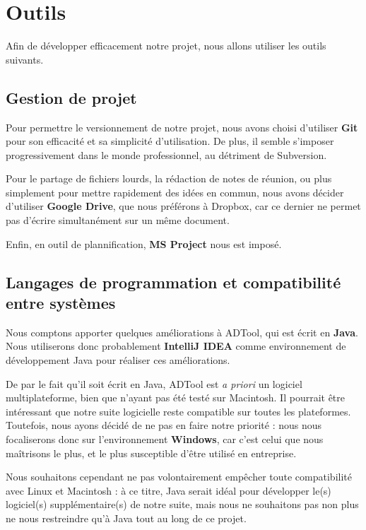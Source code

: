 \section{Outils}
    Afin de développer efficacement notre projet, nous allons utiliser les outils suivants.
     
    \subsection{Gestion de projet}
        Pour permettre le versionnement de notre projet, nous avons choisi d'utiliser {\bf Git} pour son efficacité et sa simplicité d'utilisation. De plus, il semble s'imposer progressivement dans le monde professionnel, au détriment de Subversion.
        
        Pour le partage de fichiers lourds, la rédaction de notes de réunion, ou plus simplement pour mettre rapidement des idées en commun, nous avons décider d'utiliser {\bf Google Drive}, que nous préférons à Dropbox, car ce dernier ne permet pas d'écrire simultanément sur un même document.

        Enfin, en outil de plannification, {\bf MS Project} nous est imposé.

    \subsection{Langages de programmation et compatibilité entre systèmes}
        Nous comptons apporter quelques améliorations à ADTool, qui est écrit en {\bf Java}. Nous utiliserons donc probablement {\bf IntelliJ IDEA} comme environnement de développement Java pour réaliser ces améliorations.
        
        De par le fait qu'il soit écrit en Java, ADTool est {\itshape a priori} un logiciel multiplateforme, bien que n'ayant pas été testé sur Macintosh. Il pourrait être intéressant que notre suite logicielle reste compatible sur toutes les plateformes. Toutefois, nous ayons décidé de ne pas en faire notre priorité : nous nous focaliserons donc sur l'environnement {\bf Windows}, car c'est celui que nous maîtrisons le plus, et le plus susceptible d'être utilisé en entreprise.
        
        Nous souhaitons cependant ne pas volontairement empêcher toute compatibilité avec Linux et Macintosh : à ce titre, Java serait idéal pour développer le(s) logiciel(s) supplémentaire(s) de notre suite, mais nous ne souhaitons pas non plus ne nous restreindre qu'à Java tout au long de ce projet.
        
